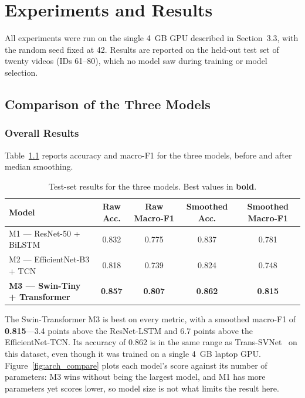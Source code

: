 \chapter{Experiments and Results}

All experiments were run on the single 4~GB GPU described in Section~3.3, with the random seed fixed at 42. Results are reported on the held-out test set of twenty videos (IDs 61--80), which no model saw during training or model selection.

\section{Comparison of the Three Models}

\subsection{Overall Results}

Table~\ref{tab:model_comparison} reports accuracy and macro-F1 for the three models, before and after median smoothing.

\begin{table}[H]
\centering
\caption{Test-set results for the three models. Best values in \textbf{bold}.}
\label{tab:model_comparison}
\begin{tabular}{lcccc}
\toprule
\textbf{Model} & \textbf{Raw Acc.} & \textbf{Raw Macro-F1} & \textbf{Smoothed Acc.} & \textbf{Smoothed Macro-F1} \\
\midrule
M1 --- ResNet-50 + BiLSTM      & 0.832 & 0.775 & 0.837 & 0.781 \\
M2 --- EfficientNet-B3 + TCN   & 0.818 & 0.739 & 0.824 & 0.748 \\
\textbf{M3 --- Swin-Tiny + Transformer} & \textbf{0.857} & \textbf{0.807} & \textbf{0.862} & \textbf{0.815} \\
\bottomrule
\end{tabular}
\end{table}

The Swin-Transformer M3 is best on every metric, with a smoothed macro-F1 of \textbf{0.815}---3.4 points above the ResNet-LSTM and 6.7 points above the EfficientNet-TCN. Its accuracy of 0.862 is in the same range as Trans-SVNet~\cite{gao2021transsvnet} on this dataset, even though it was trained on a single 4~GB laptop GPU. Figure~\ref{fig:arch_compare} plots each model's score against its number of parameters: M3 wins without being the largest model, and M1 has more parameters yet scores lower, so model size is not what limits the result here.


